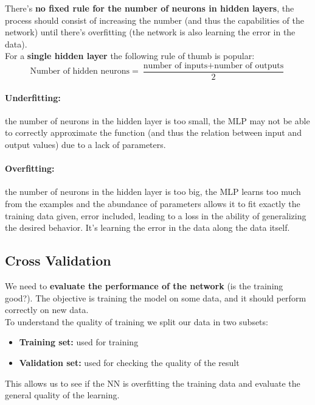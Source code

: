 \documentclass[11pt]{article}
\begin{document}
		There's \textbf{no fixed rule for the number of neurons in hidden layers}, the process should consist of increasing the number (and thus the capabilities of the network) until there's overfitting (the network is also learning the error in the data).\\
		
		For a \textbf{single hidden layer} the following rule of thumb is popular: 
		$$ \text{Number of hidden neurons} = \frac{\text{number of inputs} + \text{number of outputs}}{2}$$
		
		\paragraph{Underfitting:} the number of neurons in the hidden layer is too small, the MLP may not be able to correctly approximate the function (and thus the relation between input and output values) due to a lack of parameters.\\
		
		\paragraph{Overfitting:} the number of neurons in the hidden layer is too big, the MLP learns too much from the examples and the abundance of parameters allows it to fit exactly the training data given, error included, leading to a loss in the ability of generalizing the desired behavior. It's learning the error in the data along the data itself.\\
		
		\newpage
		
		\subsection{Cross Validation}
		We need to \textbf{evaluate the performance of the network} (is the training good?). The objective is training the model on some data, and it should perform correctly on new data. \\
		
		To understand the quality of training we split our data in two subsets: 
		\begin{itemize}
			\item \textbf{Training set:} used for training
			\item \textbf{Validation set:} used for checking the quality of the result
		\end{itemize}
		This allows us to see if the NN is overfitting the training data and evaluate the general quality of the learning. \\
		
\end{document}
